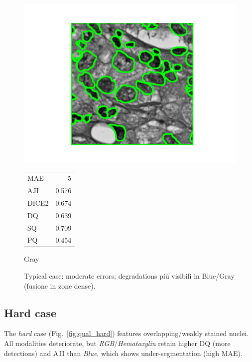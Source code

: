 \documentclass[target=bach,aauheader=,style=]{thud}
\begin{document}
\begin{figure}[ht]
\begin{minipage}{0.48\textwidth}
  \includegraphics[width=\linewidth]{imgs/qualitative/medium/Gray/contour_img.png}\\[-1ex]
  \footnotesize
  \begin{tabular}{@{}lr@{}}
   MAE & 5\\ AJI & 0.576\\ DICE2 & 0.674\\
   DQ & 0.639\\ SQ & 0.709\\ PQ & 0.454
  \end{tabular}
  \caption*{Gray}
\end{minipage}

\caption{Typical case: moderate errors; degradations più visibili in Blue/Gray (fusione in zone dense).}
\label{fig:qual_typical}
\end{figure}

\subsection{Hard case}
The \emph{hard} case (Fig.~\ref{fig:qual_hard}) features overlapping/weakly stained nuclei. All modalities deteriorate, but \emph{RGB}/\emph{Hematoxylin} retain higher DQ (more detections) and AJI than \emph{Blue}, which shows under-segmentation (high MAE).
\end{document}
